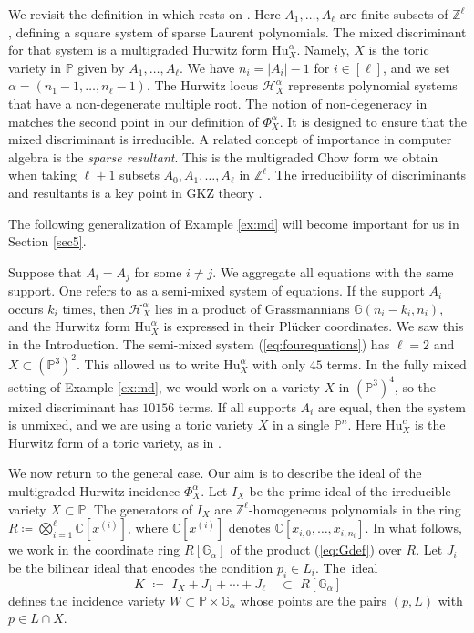 \documentclass[12pt]{article}
\theoremstyle{definition}
\newenvironment{example}
{\pushQED{\qed}\renewcommand{\qedsymbol}{$\diamond$}\examplex}
{\popQED\endexamplex}
\newcommand{\bC}{\mathbb C}
\newcommand{\bZ}{\mathbb Z}
\newcommand{\bG}{\mathbb G}
\newcommand{\bP}{\mathbb P}
\newcommand{\cH}{\mathcal H}
\begin{document}
\begin{example}[Mixed discriminants] \label{ex:md}
We revisit the definition in \cite{CCDDS}
which rests on \cite{GKZ}.
Here $A_1,\ldots,A_\ell$ are finite subsets of $\bZ^\ell$,
defining a square system of sparse Laurent polynomials.
The mixed discriminant for that system is a multigraded
Hurwitz form $\mathrm{Hu}_X^\alpha$.
Namely, $X$ is the  toric variety in $\bP$ given 
by $A_1,\ldots,A_\ell$. We have $n_i = |A_i| -1$ for $i \in [\ell]$,
and we set $\alpha = (n_1 - 1,\ldots,n_\ell - 1)$.
The Hurwitz locus $\cH_X^\alpha$ represents 
 polynomial systems \cite[eqn (1)]{CCDDS} that have
a non-degenerate multiple root. The notion of
non-degeneracy in \cite{CCDDS} matches the second point
in our definition of $\Phi^\alpha_X$. It is designed to  ensure that the mixed discriminant is irreducible.
A related concept of importance in computer algebra is the {\em sparse resultant}.
This is the multigraded Chow form \cite{OT} we obtain when taking
$\ell+1$ subsets $A_0,A_1,\ldots, A_\ell$ in $\bZ^\ell$. The irreducibility of 
 discriminants and resultants is a key point in GKZ theory \cite{GKZ}.
 \end{example}

The following generalization of Example \ref{ex:md} will become important for us in Section \ref{sec5}.

\begin{example}[Semi-mixed discriminants] \label{ex:semimd}
Suppose that $A_i = A_j$ for some $i \not= j$.
We aggregate all equations  with the same support. One 
refers to \cite[eqn (1)]{CCDDS} as a semi-mixed system of equations.
If the support $A_i$ occurs $k_i$ times, then $\mathcal{H}^\alpha_X$ lies in
a product of Grassmannians $\bG(n_i-k_i,n_i)$, and the Hurwitz 
form $\mathrm{Hu}^\alpha_X$ is expressed in their Pl\"ucker coordinates.
We saw this in the Introduction. The semi-mixed system
(\ref{eq:fourequations}) has $\ell=2$ and $X \subset (\bP^3)^2$.
This allowed us to write $\mathrm{Hu}^\alpha_X$ with only $45$ terms.
In the fully mixed setting of Example \ref{ex:md}, we would
work on a variety $X$ in $(\bP^3)^4$, so the mixed discriminant has 
$10156$ terms. If all supports $A_i$ are equal, then the
system is unmixed, and we are using a toric variety $X$
in a single $\bP^n$. Here $\mathrm{Hu}^c_X$ is the
Hurwitz form of a toric variety, as  in 
\cite[Examples 2.3 and 2.7]{hurwitz}.
\end{example}

We now return to the general case. Our  aim is to
describe the  ideal of the multigraded Hurwitz incidence $\Phi^\alpha_X$.
Let $I_X$ be the prime ideal of the irreducible variety $X \subset \bP$.
The generators of $I_X$ are $\bZ^\ell$-homogeneous polynomials in the ring $R\coloneqq\bigotimes_{i=1}^\ell \bC[x^{(i)}]$, where $\bC[x^{(i)}]$ denotes $\bC[x_{i,0},\ldots,x_{i,n_i}]$.  In what follows,
 we work in the coordinate ring $R[\bG_\alpha]$ of the product (\ref{eq:Gdef}) over $R$.
Let $J_i$ be the  bilinear ideal that encodes the condition $p_i\in L_i$. The~ideal
\[
    K\,\,\coloneqq \,\,I_X + J_1 + \cdots + J_\ell \quad \subset \,\, R[\bG_\alpha]
\]
defines the incidence variety $W\subset\bP \times  \bG_\alpha$ 
whose points are the pairs $(p,L)$ with $p\in L\cap X$. 
\end{document}
